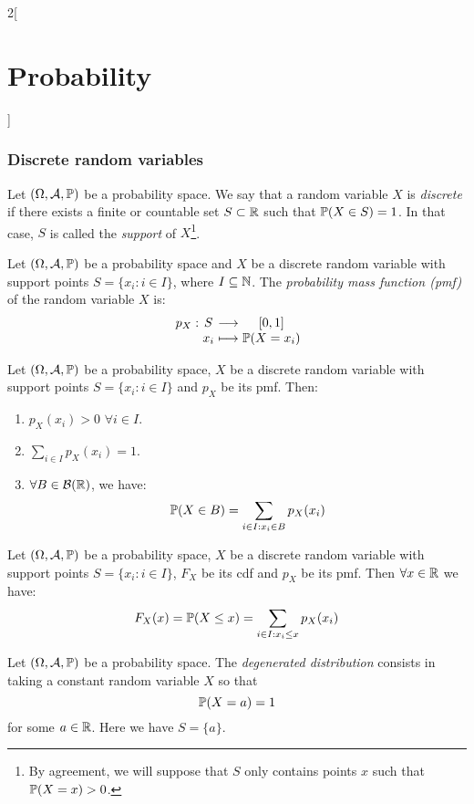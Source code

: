 \documentclass[../../../main.tex]{subfiles}
\begin{document}
\begin{multicols}{2}[\section{Probability}]
  \subsubsection{Discrete random  variables}
  \begin{definition}
    Let $(\Omega,\mathcal{A},\mathbb{P})$ be a probability space. We say that a random variable $X$ is \textit{discrete} if there exists a finite or countable set $S\subset\mathbb{R}$ such that $\mathbb{P}(X\in S)=1$. In that case, $S$ is called the \textit{support} of $X$\footnote{By agreement, we will suppose that $S$ only contains points $x$ such that $\mathbb{P}(X=x)>0$.}.
  \end{definition}
  \begin{definition}
    Let $(\Omega,\mathcal{A},\mathbb{P})$ be a probability space and $X$ be a discrete random variable with support points $S=\{x_i:i\in I\}$, where $I\subseteq\mathbb{N}$. The \textit{probability mass function (pmf)} of the random variable $X$ is:
    $$
      \function{p_X}{S}{[0,1]}{x_i}{\Prob(X=x_i)}
    $$
  \end{definition}
  \begin{prop}
    Let $(\Omega,\mathcal{A},\mathbb{P})$ be a probability space, $X$ be a discrete random variable with support points $S=\{x_i:i\in I\}$ and $p_X$ be its pmf. Then:
    \begin{enumerate}
      \item $p_X(x_i)>0$ $\forall i\in I$.
      \item $\displaystyle\sum_{i\in I}p_X(x_i)=1$.
      \item $\forall B\in\mathcal{B}(\mathbb{R})$, we have: $$\mathbb{P}(X\in B)=\sum_{i\in I:x_i\in B}p_X(x_i)$$
    \end{enumerate}
  \end{prop}
  \begin{corollary}
    Let $(\Omega,\mathcal{A},\mathbb{P})$ be a probability space, $X$ be a discrete random variable with support points $S=\{x_i:i\in I\}$, $F_X$ be its cdf and $p_X$ be its pmf. Then $\forall x\in\mathbb{R}$ we have: $$F_X(x)=\mathbb{P}(X\leq x)=\sum_{i\in I:x_i\leq x}p_X(x_i)$$
  \end{corollary}
  \begin{definition}
    Let $(\Omega,\mathcal{A},\mathbb{P})$ be a probability space. The \textit{degenerated distribution} consists in taking a constant random variable $X$ so that $$\mathbb{P}(X=a)=1$$ for some $a\in\mathbb{R}$. Here we have $S=\{a\}$.
  \end{definition}
  \begin{definition}

\end{definition}
\end{multicols}
\end{document}
